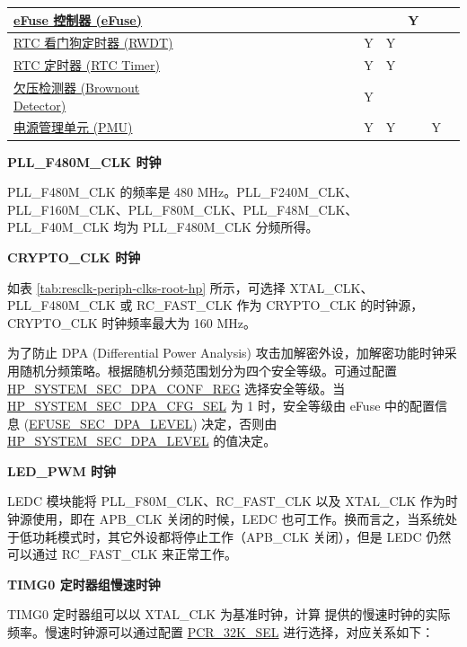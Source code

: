 \documentclass[main\_\_CN.tex]{subfiles}
\begin{document}
\begin{landscape}
\begin{tiny}
\begin{longtable}[c]{|m{2.1cm}|c|c|c|c|c|c|c|c|C{1.4cm}|c|c|c|c|c|c|c|c|c| }
    \hyperref[mod:efuse]{eFuse 控制器 (eFuse)} &  &  &  &  &  &  &  &  &  &  &    &  &  &  &  & Y &  &  \\ \hline
    \hyperref[mod:wdt]{RTC 看门狗定时器 (RWDT)}  &  &  &  &  &  &  &  &  &  &  &    &  &  & Y & Y &  &  &  \\ \hline
    \hyperref[mod:lowpowm]{RTC 定时器 (RTC Timer)}  &  &  &  &  &  &  &  &  &  &    &  &  &  & Y & Y &  &  &  \\ \hline
    \hyperref[mod:lowpowm]{欠压检测器 (Brownout Detector)} &  &  &  &  &  &  &  &    &  &  &  &  &  & Y &  &  &  &  \\ \hline
    \hyperref[mod:lowpowm]{电源管理单元 (PMU)} &  &  &  &  &  &  &  &  &  &  &  &    &  & Y & Y &  & Y &  \\ \hline
\end{longtable}
\end{tiny}

\end{landscape}


\textbf{PLL\_F480M\_CLK 时钟}

PLL\_F480M\_CLK 的频率是 480 MHz。PLL\_F240M\_CLK、PLL\_F160M\_CLK、PLL\_F80M\_CLK、PLL\_F48M\_CLK、PLL\_F40M\_CLK 均为 PLL\_F480M\_CLK 分频所得。

\textbf{CRYPTO\_CLK 时钟}

如表 \ref{tab:resclk-periph-clks-root-hp} 所示，可选择 XTAL\_CLK、PLL\_F480M\_CLK 或 RC\_FAST\_CLK 作为 CRYPTO\_CLK 的时钟源，CRYPTO\_CLK 时钟频率最大为 160 MHz。


为了防止 DPA (Differential Power Analysis) 攻击加解密外设，加解密功能时钟采用随机分频策略。根据随机分频范围划分为四个安全等级。可通过配置 \hyperref[regdesc:HPSYSTEMSECDPACONFREG]{HP\_SYSTEM\_SEC\_DPA\_CONF\_REG} 选择安全等级。当 \hyperref[fielddesc:HPSYSTEMSECDPACFGSEL]{HP\_SYSTEM\_SEC\_DPA\_CFG\_SEL} 为 1 时，安全等级由 eFuse 中的配置信息 (\hyperref[fielddesc:EFUSESECDPALEVEL]{EFUSE\_SEC\_DPA\_LEVEL}) 决定，否则由 \hyperref[fielddesc:HPSYSTEMSECDPALEVEL]{HP\_SYSTEM\_SEC\_DPA\_LEVEL} 的值决定。

\textbf{LED\_PWM 时钟}

LEDC 模块能将 PLL\_F80M\_CLK、RC\_FAST\_CLK 以及 XTAL\_CLK 作为时钟源使用，即在 APB\_CLK 关闭的时候，LEDC 也可工作。换而言之，当系统处于低功耗模式时，其它外设都将停止工作（APB\_CLK 关闭），但是 LEDC 仍然可以通过 RC\_FAST\_CLK 来正常工作。

\textbf{TIMG0 定时器组慢速时钟}
\label{sec:pcr_peri_timg}

TIMG0 定时器组可以以 XTAL\_CLK 为基准时钟，计算 \chipseries{} 提供的慢速时钟的实际频率。慢速时钟源可以通过配置 \hyperref[fielddesc:PCR32KSEL]{PCR\_32K\_SEL} 进行选择，对应关系如下：
\end{document}
